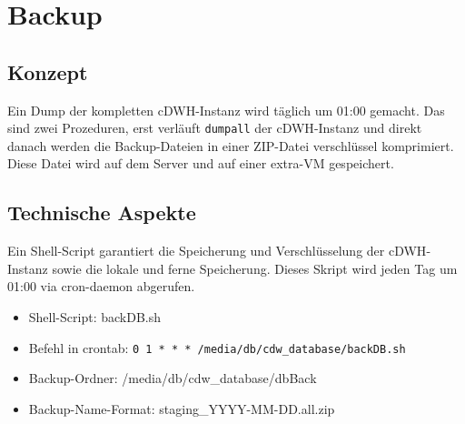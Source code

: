 \chapter{Backup}
\label{ch:back}
  \section{Konzept}
  Ein Dump der kompletten \ac{cDWH}-Instanz wird täglich um 01:00 gemacht. Das sind zwei Prozeduren, erst verläuft  \texttt{dumpall} der \ac{cDWH}-Instanz und direkt danach werden die Backup-Dateien in einer ZIP-Datei verschlüssel komprimiert.
  Diese Datei wird auf dem Server und auf einer extra-VM gespeichert.
  \section{Technische Aspekte}
  Ein Shell-Script garantiert die Speicherung und Verschlüsselung der \ac{cDWH}-Instanz sowie die lokale und ferne Speicherung. Dieses Skript wird jeden Tag um 01:00 via cron-daemon abgerufen.
  \begin{itemize}
   \item Shell-Script: backDB.sh
   \item Befehl in crontab: \texttt{0 1 * * * /media/db/cdw\_database/backDB.sh}
   \item Backup-Ordner: /media/db/cdw\_database/dbBack
   \item Backup-Name-Format: staging\_YYYY-MM-DD.all.zip
  \end{itemize}
